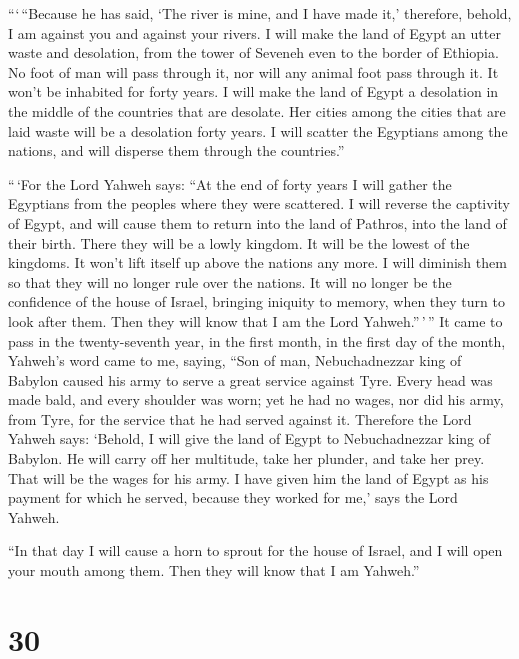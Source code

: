 ```\,``Because he has said, `The river is mine, and I have made it,'
 therefore, behold, I am against you and against your
rivers. I will make the land of Egypt an utter waste and desolation,
from the tower of Seveneh even to the border of Ethiopia. 
No foot of man will pass through it, nor will any animal foot pass
through it. It won't be inhabited for forty years.  I will
make the land of Egypt a desolation in the middle of the countries that
are desolate. Her cities among the cities that are laid waste will be a
desolation forty years. I will scatter the Egyptians among the nations,
and will disperse them through the countries.''

 ``\,`For the Lord Yahweh says: ``At the end of forty years
I will gather the Egyptians from the peoples where they were scattered.
 I will reverse the captivity of Egypt, and will cause them
to return into the land of Pathros, into the land of their birth. There
they will be a lowly kingdom.  It will be the lowest of the
kingdoms. It won't lift itself up above the nations any more. I will
diminish them so that they will no longer rule over the nations.
 It will no longer be the confidence of the house of
Israel, bringing iniquity to memory, when they turn to look after them.
Then they will know that I am the Lord Yahweh.''\,'\,''  It
came to pass in the twenty-seventh year, in the first month, in the
first day of the month, Yahweh's word came to me, saying, 
``Son of man, Nebuchadnezzar king of Babylon caused his army to serve a
great service against Tyre. Every head was made bald, and every shoulder
was worn; yet he had no wages, nor did his army, from Tyre, for the
service that he had served against it.  Therefore the Lord
Yahweh says: `Behold, I will give the land of Egypt to Nebuchadnezzar
king of Babylon. He will carry off her multitude, take her plunder, and
take her prey. That will be the wages for his army.  I have
given him the land of Egypt as his payment for which he served, because
they worked for me,' says the Lord Yahweh.

 ``In that day I will cause a horn to sprout for the house
of Israel, and I will open your mouth among them. Then they will know
that I am Yahweh.''

\hypertarget{section-28}{%
\section{30}\label{section-28}}

